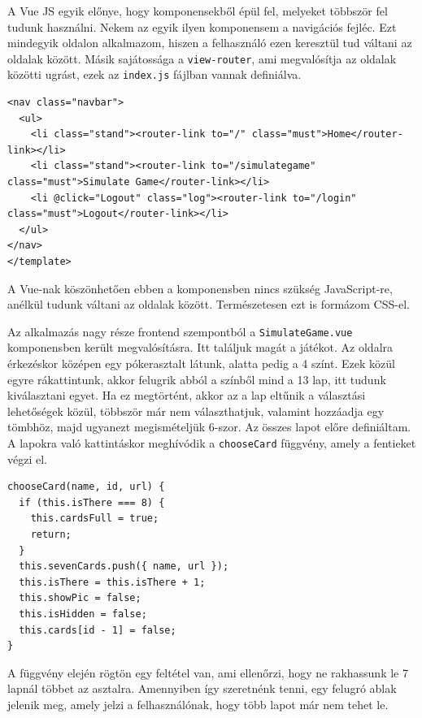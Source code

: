 A Vue JS egyik előnye, hogy komponensekből épül fel, melyeket többször fel tudunk használni. Nekem az egyik ilyen komponensem a navigációs fejléc. Ezt mindegyik oldalon alkalmazom, hiszen a felhasználó ezen keresztül tud váltani az oldalak között. Másik sajátossága a \texttt{view-router}, ami megvalósítja az oldalak közötti ugrást, ezek az \texttt{index.js} fájlban vannak definiálva.

\begin{lstlisting}[style=htmlcssjs]
<nav class="navbar">
  <ul>
    <li class="stand"><router-link to="/" class="must">Home</router-link></li>
    <li class="stand"><router-link to="/simulategame" class="must">Simulate Game</router-link></li>
    <li @click="Logout" class="log"><router-link to="/login" class="must">Logout</router-link></li>
  </ul>
</nav>
</template>
\end{lstlisting}

A Vue-nak köszönhetően ebben a komponensben nincs szükség JavaScript-re, anélkül tudunk váltani az oldalak között. Természetesen ezt is formázom CSS-el.


Az alkalmazás nagy része frontend szempontból a \texttt{SimulateGame.vue} komponensben került megvalósításra. Itt találjuk magát a játékot. Az oldalra érkezéskor középen egy pókerasztalt látunk, alatta pedig a 4 színt. Ezek közül egyre rákattintunk, akkor felugrik abból a színből mind a 13 lap, itt tudunk kiválasztani egyet. Ha ez megtörtént, akkor az a lap eltűnik a választási lehetőségek közül, többször már nem választhatjuk, valamint hozzáadja egy tömbhöz, majd ugyanezt megismételjük 6-szor. Az összes lapot előre definiáltam. A lapokra való kattintáskor meghívódik a \texttt{chooseCard} függvény, amely a fentieket végzi el.

\newpage

\begin{lstlisting}[style=htmlcssjs]
chooseCard(name, id, url) {
  if (this.isThere === 8) {
    this.cardsFull = true;
    return;
  }
  this.sevenCards.push({ name, url });
  this.isThere = this.isThere + 1;
  this.showPic = false;
  this.isHidden = false;
  this.cards[id - 1] = false;
}
\end{lstlisting}

A függvény elején rögtön egy feltétel van, ami ellenőrzi, hogy ne rakhassunk le 7 lapnál többet az asztalra. Amennyiben így szeretnénk tenni, egy felugró ablak jelenik meg, amely jelzi a felhasználónak, hogy több lapot már nem tehet le.

